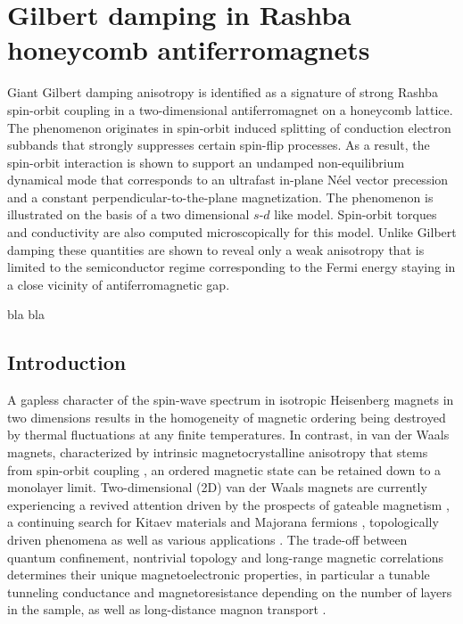 \chapter{Gilbert damping in Rashba honeycomb antiferromagnets} %
Giant Gilbert damping anisotropy is identified as a signature of strong Rashba spin-orbit coupling in a two-dimensional antiferromagnet on a honeycomb lattice. The phenomenon originates in spin-orbit induced splitting of conduction electron subbands that strongly suppresses certain spin-flip processes. As a result, the spin-orbit interaction is shown to support an undamped non-equilibrium dynamical mode that corresponds to an ultrafast in-plane N\'eel vector precession and a constant perpendicular-to-the-plane magnetization. The phenomenon is illustrated on the basis of a two dimensional $s$-$d$ like model. Spin-orbit torques and conductivity are also computed microscopically for this model. Unlike Gilbert damping these quantities are shown to reveal only a weak anisotropy that is limited to the semiconductor regime corresponding to the Fermi energy staying in a close vicinity of antiferromagnetic gap.

\vfill
bla bla
\clearpage

\section{Introduction}

A gapless character of the spin-wave spectrum in isotropic Heisenberg magnets in two dimensions results in the homogeneity of magnetic ordering being destroyed by thermal fluctuations at any finite temperatures. In contrast, in van der Waals magnets, characterized by intrinsic magnetocrystalline anisotropy that stems from spin-orbit coupling \cite{Lado2017}, an ordered magnetic state can be retained down to a monolayer limit. Two-dimensional (2D) van der Waals magnets are currently experiencing a revived attention \cite{Gong2017,Herrero2017,Burch2018,Tokmachev2018,Gong2019,Novoselov2019,Cortie2019} driven by the prospects of gateable magnetism \cite{Huang2018,Shengwei2018,Wang2018,Deng2018}, a continuing search for Kitaev materials \cite{Nagler2019,Gordon2019} and Majorana fermions \cite{Livanas2019}, topologically driven phenomena \cite{Mokrousov2019} as well as various applications \cite{Herrero2017,Burch2018,Novoselov2019}. The trade-off between quantum confinement, nontrivial topology and long-range magnetic correlations determines their unique magnetoelectronic properties, in particular a tunable tunneling conductance \cite{Wang2018a} and magnetoresistance \cite{Song2018,Klein2018,Kim2018} depending on the number of layers in the sample, as well as long-distance magnon transport \cite{Xing2019}. 

